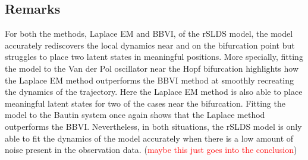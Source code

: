 \subsection{Remarks}
For both the methods, Laplace EM and BBVI, of the rSLDS model, the model accurately rediscovers the local dynamics near and on the bifurcation point but struggles to place two latent states in meaningful positions. More specially, fitting the model to the Van der Pol oscillator near the Hopf bifurcation highlights how the Laplace EM method outperforms the BBVI method at smoothly recreating the dynamics of the trajectory. Here the Laplace EM method is also able to place meaningful latent states for two of the cases near the bifurcation. Fitting the model to the Bautin system once again shows that the Laplace method outperforms the BBVI. Nevertheless, in both situations, the rSLDS model is only able to fit the dynamics of the model accurately when there is a low amount of noise present in the observation data. (\textcolor{red}{maybe this just goes into the conclusion})